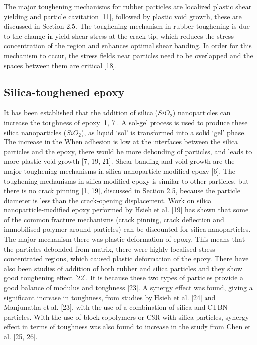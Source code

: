 \documentclass[numbers=noendperiod,chapterprefix=on]{icldt} %
\begin{document}
The major toughening mechanisms for rubber particles are localized plastic shear yielding and particle cavitation [11], followed by plastic void growth, these are discussed in Section 2.5. The toughening mechanism in rubber toughening is due to the change in yield shear stress at the crack tip, which reduces the stress concentration of the region and enhances optimal shear banding. In order for this mechanism to occur, the stress fields near particles need to be overlapped and the spaces between them are critical [18]. 

\subsection{Silica-toughened epoxy}
It has been established that the addition of silica ($SiO_2$) nanoparticles can increase the toughness of epoxy [1, 7]. A sol-gel process is used to produce these silica nanoparticles ($SiO_2$), as liquid ‘sol’ is transformed into a solid ‘gel’ phase. The increase in the %
When adhesion is low at the interfaces between the silica particles and the epoxy, there would be more debonding of particles, and leads to more plastic void growth [7, 19, 21]. Shear banding and void growth are the major toughening mechanisms in silica nanoparticle-modified epoxy [6].
The toughening mechanisms in silica-modified epoxy is similar to other particles, but there is no crack pinning [1, 19], discussed in Section 2.5, because the particle diameter is less than the crack-opening displacement. Work on silica nanoparticle-modified epoxy performed by Hsieh et al. [19] has shown that some of the common fracture mechanisms (crack pinning, crack deflection and immobilised polymer around particles) can be discounted for silica nanoparticles. The major mechanism there was plastic deformation of epoxy. This means that the particles debonded from matrix, there were highly localised stress concentrated regions, which caused plastic deformation of the epoxy. 
There have also been studies of addition of both rubber and silica particles and they show good toughening effect [22]. It is because these two types of particles provide a good balance of modulus and toughness [23]. A synergy effect was found, giving a significant increase in toughness, from studies by Hsieh et al. [24] and Manjunatha et al. [23], with the use of a combination of silica and CTBN particles. With the use of block copolymers or CSR with silica particles, synergy effect in terms of toughness was also found to increase in the study from Chen et al. [25, 26]. 
\end{document}
